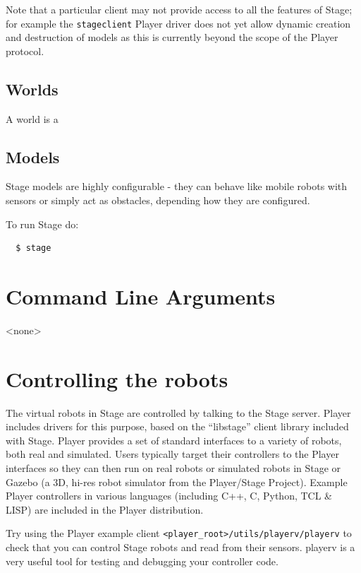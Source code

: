 \documentclass[letter,11pt,twoside]{report}
\begin{document}
Note that a particular client may not provide access to all the
  features of Stage; for example the {\tt stageclient} Player driver
  does not yet allow dynamic creation and destruction of models as
  this is currently beyond the scope of the Player protocol.

\subsection{Worlds}

A world is a 

\subsection{Models}

 Stage models are highly configurable - they can behave like mobile
robots with sensors or simply act as obstacles, depending how they are
configured.




 To run Stage do:
 \begin{verbatim} 
  $ stage
 \end{verbatim} 

\section{Command Line Arguments}

<none>

\section{Controlling the robots}

The virtual robots in Stage are controlled by talking to the Stage
server. Player includes drivers for this purpose, based on the
``libstage'' client library included with Stage. Player provides a set
of standard interfaces to a variety of robots, both real and
simulated. Users typically target their controllers to the Player
interfaces so they can then run on real robots or simulated robots in
Stage or Gazebo (a 3D, hi-res robot simulator from the Player/Stage
Project). Example Player controllers in various languages (including C++,
C, Python, TCL \& LISP) are included in the Player distribution.

Try using the Player example client
\verb+<player_root>/utils/playerv/playerv+ to check that you can control
Stage robots and read from their sensors. playerv is a very useful
tool for testing and debugging your controller code.
\end{document}
